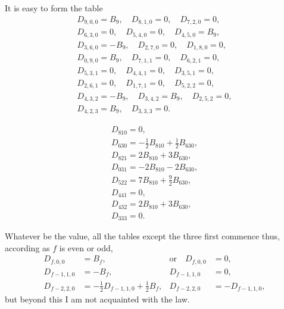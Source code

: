 \documentclass[11pt,a4paper]{book}
\begin{document}
It is easy to form the table
\begin{gather*}
D_{9,0,0} = B_9,\quad D_{8,1,0} = 0,\quad D_{7,2,0} = 0,\\
D_{6,3,0} = 0,\quad D_{5,4,0} = 0,\quad D_{4,5,0} = B_9,\\
D_{3,6,0} = -B_9,\quad D_{2,7,0} = 0,\quad D_{1,8,0} = 0,\\
D_{0,9,0} = B_9,\quad D_{7,1,1} = 0,\quad D_{6,2,1} = 0,\\
D_{5,3,1} = 0,\quad D_{4,4,1} = 0,\quad D_{3,5,1} = 0,\\
D_{2,6,1} = 0,\quad D_{1,7,1} = 0,\quad D_{5,2,2} = 0,\\
D_{4,3,2} = -B_9,\quad D_{3,4,2} = B_9,\quad D_{2,5,2} = 0,\\
D_{4,2,3} = B_9,\quad D_{3,3,3} = 0.
\end{gather*}

\newpage
\setcounter{page}{106}
\begin{gather*}
D_{810} = 0,\\
D_{630} = -\tfrac{1}{2} B_{810} + \tfrac{1}{2} B_{630},\\
D_{821} = 2B_{810} + 3B_{630},\\
D_{031} = -2B_{810} - 2B_{630},\\
D_{522} = 7B_{810} + \tfrac{9}{2} B_{630},\\
D_{441} = 0,\\
D_{432} = 2B_{810} + 3B_{630},\\
D_{333} = 0.
\end{gather*}

Whatever be the value, all the tables except the three first commence thus, according
as $f$ is even or odd,
\begin{align*}
D_{f,0,0} &= B_f, & \text{or}\quad D_{f,0,0} &= 0,\\
D_{f-1,1,0} &= -B_f, & D_{f-1,1,0} &= 0,\\
D_{f-2,2,0} &= -\tfrac{1}{2}D_{f-1,1,0} + \tfrac{1}{2}B_f, & D_{f-2,2,0} &= -D_{f-1,1,0},
\end{align*}
but beyond this I am not acquainted with the law.
\end{document}
